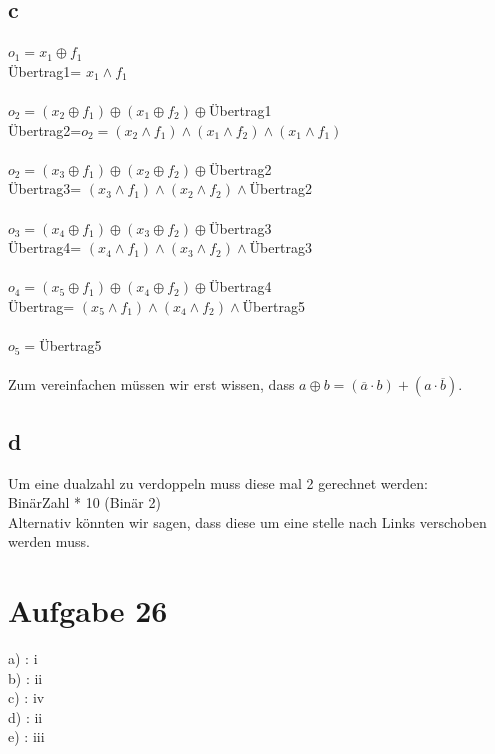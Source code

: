 \documentclass[10pt,a4paper]{article}
\begin{document}
\subsection{c}
$o_1 = x_1 \oplus f_1$\\
Übertrag1= $ x_1 \wedge f_1 $\\\\
$o_2 = (x_2 \oplus f_1) \oplus (x_1 \oplus f_2) \oplus $Übertrag1 \\
Übertrag2=$o_2 = (x_2 \wedge f_1) \wedge (x_1 \wedge f_2) \wedge (x_1 \wedge f_1)$ \\\\
$o_2 = (x_3 \oplus f_1) \oplus (x_2 \oplus f_2) \oplus $Übertrag2  \\
Übertrag3= $(x_3 \wedge f_1) \wedge (x_2 \wedge f_2) \wedge $Übertrag2  \\\\
$o_3 = (x_4 \oplus f_1) \oplus (x_3 \oplus f_2) \oplus $Übertrag3  \\
Übertrag4= $(x_4 \wedge f_1) \wedge (x_3 \wedge f_2) \wedge $Übertrag3  \\\\
$o_4 = (x_5 \oplus f_1) \oplus (x_4 \oplus f_2) \oplus $Übertrag4\\
Übertrag= $(x_5 \wedge f_1) \wedge (x_4 \wedge f_2) \wedge $Übertrag5  \\\\
$o_5 = $Übertrag5\\\\
Zum vereinfachen müssen wir erst wissen, dass $a \oplus b = (\overline{a}\cdot b)+(a\cdot \overline{b})$.\\


\subsection{d}
Um eine dualzahl zu verdoppeln muss diese mal 2 gerechnet werden:\\
BinärZahl * 10 (Binär 2)\\
Alternativ könnten wir sagen, dass diese um eine stelle nach Links verschoben werden muss.

\section{Aufgabe 26}
a) : i\\
b) : ii\\
c) : iv\\
d) : ii\\
e) : iii\\
\end{document}
